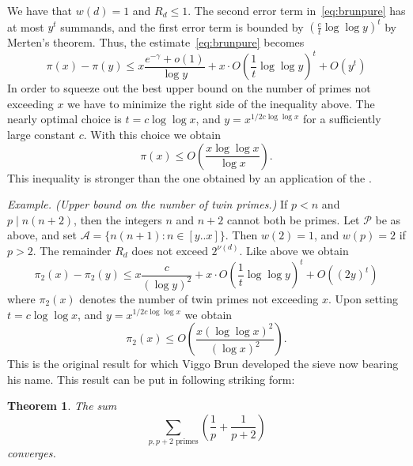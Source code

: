 \documentclass[12pt]{article}
\newtheorem*{theorem}{Theorem}
\begin{document}
We have that $w(d)=1$ and $R_d\leq 1$. The second error term
in~\eqref{eq:brunpure} has at most $y^t$ summands, and the first
error term is bounded by $(\frac{c}{t}\log\log y)^t$ by Merten's
theorem. Thus, the estimate~\eqref{eq:brunpure} becomes
\begin{equation*}
\pi(x)-\pi(y)\leq x\frac{e^{-\gamma}+o(1)}{\log y}+x\cdot
O\left(\frac{1}{t}\log\log y\right)^t+O(y^t)
\end{equation*}
In order to squeeze out the best upper bound on the number of primes
not exceeding $x$ we have to minimize the right side of the
inequality above. The nearly optimal choice is $t=c\log \log x$,
and $y=x^{1/2c\log\log x}$ for a sufficiently large constant $c$.
With this choice we obtain
\begin{equation*}
\pi(x)\leq O\left(\frac{x\log\log x}{\log x}\right).
\end{equation*}
This inequality is stronger than the one obtained by an
application of the .

\emph{Example. (Upper bound on the number of twin primes.)} If
$p<n$ and $p\mid n(n+2)$, then the integers $n$ and $n+2$ cannot
both be primes. Let $\mathcal{P}$ be as above, and set
$\mathcal{A}=\{ n(n+1) : n\in [y..x]\}$. Then $w(2)=1$, and
$w(p)=2$ if $p>2$. The remainder $R_d$ does not exceed
$2^{\nu(d)}$. Like above we obtain
\begin{equation*}
\pi_2(x)-\pi_2(y)\leq x\frac{c}{(\log y)^2}+x\cdot
O\left(\frac{1}{t}\log\log y\right)^t+O((2y)^t)
\end{equation*}
where $\pi_2(x)$ denotes the number of twin primes not exceeding
$x$. Upon setting $t=c\log \log x$, and $y=x^{1/2c\log\log x}$ we
obtain
\begin{equation*}
\pi_2(x)\leq O\left(\frac{x(\log\log x)^2}{(\log x)^2}\right).
\end{equation*}
This is the original result for which Viggo Brun developed the
sieve now bearing his name. This result can be put in following
striking form:
\begin{theorem}The sum
\begin{equation*}
\sum_{p,p+2\text{ primes}} \left(\frac{1}{p}+\frac{1}{p+2}\right)
\end{equation*}
converges.
\end{theorem}
\end{document}
